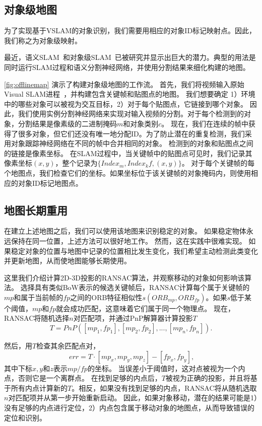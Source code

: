 \subsection{对象级地图}\label{sec:map}
为了实现基于VSLAM的对象识别，我们需要用相应的对象ID标记映射点。因此，我们称之为对象级映射。

最近，语义SLAM~\cite{bowman2017probabilistic,kaneko2018mask}和对象级SLAM~\cite{mccormac2018fusion++,strecke2019fusion}已被研究并显示出巨大的潜力。典型的用法是同时运行SLAM过程和语义分割神经网络，并使用分割结果来细化构建的地图。

\autoref{fig:offlinemap} 演示了构建对象级地图的工作流。
首先，我们将视频输入原始Visual SLAM进程~\cite{mur2017orb}，并构建包含关键帧和贴图点的地图。
我们想要确定 1）环境中的哪些对象可以被视为交互目标，2）对于每个贴图点，它链接到哪个对象。
因此，我们使用实例分割神经网络\cite{He_2017_ICCV}来实现对输入视频的分割。对于每个检测到的对象，分割结果是像素级的二进制掩码$m$和对象类别$c$。
现在，我们在连续的帧中获得了很多对象，但它们还没有唯一地分配ID。为了防止潜在的重复检测，我们采用对象跟踪神经网络在不同的帧中合并相同的对象。
检测到的对象和贴图点之间的链接是像素坐标。
在SLAM过程中，当关键帧中的贴图点可见时，我们记录其像素坐标$(x,y)$，整个记录为$\{Index_m, Index_kf, (x,y)\}$。
对于每个关键帧的每个地图点，我们检查它们的坐标。如果坐标位于该关键帧的对象掩码内，则使用相应的对象ID标记地图点。

\subsection{地图长期重用}
在建立上述地图之后，我们可以使用该地图来识别稳定的对象。
如果稳定物体永远保持在同一位置，上述方法可以很好地工作。
然而，这在实践中很难实现。
如果稳定对象的位置与地图中记录的位置相比发生变化，我们希望主动检测此类变化并更新地图，从而使地图能够长期使用。

这里我们介绍计算2D-3D投影的RANSAC\cite{derpanis2010overview}算法，并观察移动的对象如何影响该算法。
选择具有类似BoW表示的候选关键帧后，RANSAC计算每个属于关键帧的$mp$和属于当前帧的$fp$之间的ORB特征相似性$s(ORB_{mp}, ORB_{fp})$。如果$s$低于某个阈值，$mp$和$fp$就会成功匹配，这意味着它们属于同一个物理点。
现在，RANSAC将随机选择$n$对匹配项，并通过PnP解算器计算投影$T$
\begin{equation}\label{equ:pnp}
    T = PnP([mp_1, fp_1],[mp_2, fp_2], ..., [mp_n, fp_n]).
\end{equation} 

然后，用$T$检查其余匹配点对，
\begin{equation}\label{equ:check}
    \
    err = T \cdot [mp_x, mp_y, mp_z] - [fp_x, fp_y],
\end{equation} 
其中下标$x,y$和$z$表示$mp/fp$的坐标。
当误差小于阈值时，这对点被视为一个内点，否则它是一个离群点。
在找到足够的内点后，$T$被视为正确的投影，并且将基于所有内点计算新的$T$。相反，如果没有找到足够的内点，RANSAC将从随机选取$n$对匹配项并从第一步开始重新启动。
因此，如果对象移动，潜在的结果可能是1）没有足够的内点进行定位，2）内点包含属于移动对象的地图点，从而导致错误的定位和识别。

